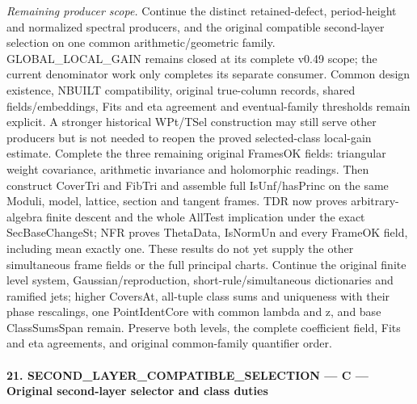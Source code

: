 \emph{Remaining producer scope.} Continue the distinct retained-defect, period-height and normalized spectral producers, and the original compatible second-layer selection on one common arithmetic/geometric family. GLOBAL\_\allowbreak LOCAL\_\allowbreak GAIN remains closed at its complete v0.49 scope; the current denominator work only completes its separate consumer. Common design existence, NBUILT compatibility, original true-column records, shared fields/embeddings, Fits and eta agreement and eventual-family thresholds remain explicit. A stronger historical WPt/TSel construction may still serve other producers but is not needed to reopen the proved selected-class local-gain estimate. Complete the three remaining original FramesOK fields: triangular weight covariance, arithmetic invariance and holomorphic readings. Then construct CoverTri and FibTri and assemble full IsUnf/hasPrinc on the same Moduli, model, lattice, section and tangent frames. TDR now proves arbitrary-algebra finite descent and the whole AllTest implication under the exact SecBaseChangeSt; NFR proves ThetaData, IsNormUn and every FrameOK field, including mean exactly one. These results do not yet supply the other simultaneous frame fields or the full principal charts. Continue the original finite level system, Gaussian/reproduction, short-rule/simultaneous dictionaries and ramified jets; higher CoversAt, all-tuple class sums and uniqueness with their phase rescalings, one PointIdentCore with common lambda and z, and base ClassSumsSpan remain. Preserve both levels, the complete coefficient field, Fits and eta agreements, and original common-family quantifier order.



\paragraph{21. SECOND\_\allowbreak LAYER\_\allowbreak COMPATIBLE\_\allowbreak SELECTION — C — Original second-layer selector and class duties}

